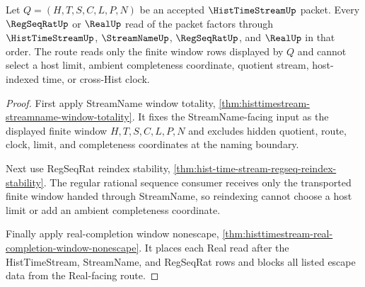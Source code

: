 \begin{theorem}
\label{thm:histtimestream-regseq-real-window-route}
Let $Q=(H,T,S,C,L,P,N)$ be an accepted $\HistTimeStreamUp$ packet. Every $\RegSeqRatUp$ or $\RealUp$ read of the packet factors through $\HistTimeStreamUp$, $\StreamNameUp$, $\RegSeqRatUp$, and $\RealUp$ in that order. The route reads only the finite window rows displayed by $Q$ and cannot select a host limit, ambient completeness coordinate, quotient stream, host-indexed time, or cross-Hist clock.
\end{theorem}
\begin{proof}
First apply StreamName window totality, \autoref{thm:histtimestream-streamname-window-totality}. It fixes the StreamName-facing input as the displayed finite window $H,T,S,C,L,P,N$ and excludes hidden quotient, route, clock, limit, and completeness coordinates at the naming boundary.

Next use RegSeqRat reindex stability, \autoref{thm:hist-time-stream-regseq-reindex-stability}. The regular rational sequence consumer receives only the transported finite window handed through StreamName, so reindexing cannot choose a host limit or add an ambient completeness coordinate.

Finally apply real-completion window nonescape, \autoref{thm:histtimestream-real-completion-window-nonescape}. It places each Real read after the HistTimeStream, StreamName, and RegSeqRat rows and blocks all listed escape data from the Real-facing route.
\end{proof}


